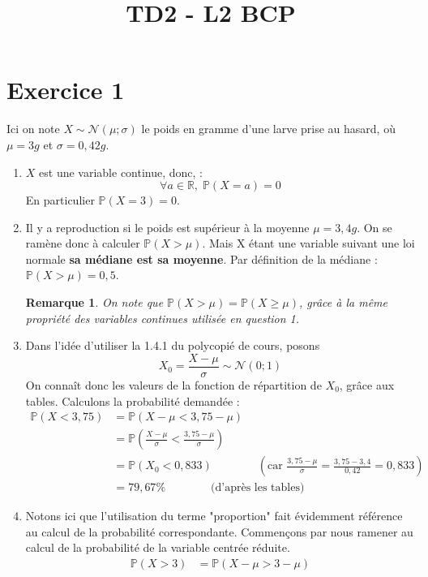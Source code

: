 \documentclass[a4paper,oneside,12pt]{article}
\title{TD2 - L2 BCP}
\author{}
\date{}
\theoremstyle{plain}
\newtheorem*{remark}{Remarque}
\def\R{{\mathbb R}}
\def\P{{\mathbb P}}
\begin{document}
\maketitle

\section*{Exercice 1}

Ici on note $X \sim \mathcal{N}(\mu; \sigma)$ le poids en gramme d'une larve prise au hasard, où $\mu = 3g$ et $\sigma = 0,42g$.

\begin{enumerate}
    \item $X$ est une variable continue, donc, :
    $$\forall a \in \R,\; \P(X=a) = 0$$
    En particulier $\P(X=3) = 0$.
    \item Il y a reproduction si le poids est supérieur à la moyenne $\mu = 3,4 g$. On se ramène donc à calculer $\P(X>\mu)$. Mais X étant une variable suivant une loi normale \textbf{sa médiane est sa moyenne}. Par définition de la médiane : $\P(X> \mu) = 0,5$.
    \begin{remark}
    On note que $\P(X> \mu) = \P(X\ge \mu)$, grâce à la même propriété des variables continues utilisée en question 1.
    \end{remark}
    \item Dans l'idée d'utiliser la 1.4.1 du polycopié de cours, posons $$X_0 = \frac{X-\mu}{\sigma}\sim\mathcal{N}(0; 1)$$
    On connaît donc les valeurs de la fonction de répartition de $X_0$, grâce aux tables. Calculons la probabilité demandée :
    \begin{align*}
        \P(X<3,75)&=\P\left(X-\mu<3,75-\mu\right)\\
        &=\P\left(\frac{X-\mu}{\sigma}<\frac{3,75-\mu}{\sigma}\right)\\
        &=\P(X_0<0,833) \qquad \qquad \left( \mbox{car } \frac{3,75-\mu}{\sigma} = \frac{3,75-3,4}{0,42} = 0,833\right)\\
        &= 79,67\% \qquad \qquad \mbox{(d'après les tables)}
    \end{align*}
    \item Notons ici que l'utilisation du terme "proportion" fait évidemment référence au calcul de la probabilité correspondante.
    Commençons par nous ramener au calcul de la probabilité de la variable centrée réduite. 
    \begin{align*}
        \P(X>3)&=\P\left(X-\mu>3-\mu\right)\\

\end{align*}
\end{enumerate}
\end{document}
